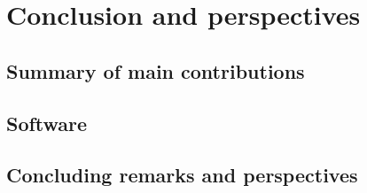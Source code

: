 \part{Conclusion and perspectives}
\chapter{Summary of main contributions}

\chapter{Software}

\chapter{Concluding remarks and perspectives}\label{chap:conclusion}

% 
% 
